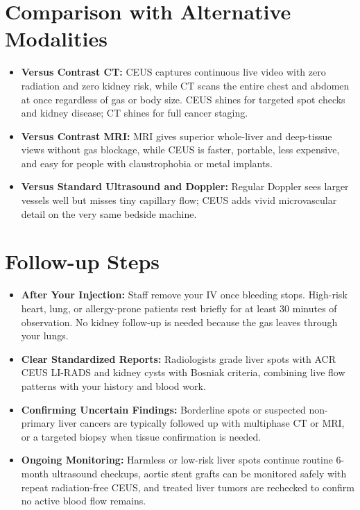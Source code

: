 \section{Comparison with Alternative Modalities}

\begin{itemize}
    \item \textbf{Versus Contrast CT:} CEUS captures continuous live video with zero radiation and zero kidney risk, while CT scans the entire chest and abdomen at once regardless of gas or body size. CEUS shines for targeted spot checks and kidney disease; CT shines for full cancer staging.
    \item \textbf{Versus Contrast MRI:} MRI gives superior whole-liver and deep-tissue views without gas blockage, while CEUS is faster, portable, less expensive, and easy for people with claustrophobia or metal implants.
    \item \textbf{Versus Standard Ultrasound and Doppler:} Regular Doppler sees larger vessels well but misses tiny capillary flow; CEUS adds vivid microvascular detail on the very same bedside machine.
\end{itemize}

\section{Follow-up Steps}

\begin{itemize}
    \item \textbf{After Your Injection:} Staff remove your IV once bleeding stops. High-risk heart, lung, or allergy-prone patients rest briefly for at least 30 minutes of observation. No kidney follow-up is needed because the gas leaves through your lungs.
    \item \textbf{Clear Standardized Reports:} Radiologists grade liver spots with ACR CEUS LI-RADS and kidney cysts with Bosniak criteria, combining live flow patterns with your history and blood work.
    \item \textbf{Confirming Uncertain Findings:} Borderline spots or suspected non-primary liver cancers are typically followed up with multiphase CT or MRI, or a targeted biopsy when tissue confirmation is needed.
    \item \textbf{Ongoing Monitoring:} Harmless or low-risk liver spots continue routine 6-month ultrasound checkups, aortic stent grafts can be monitored safely with repeat radiation-free CEUS, and treated liver tumors are rechecked to confirm no active blood flow remains.
\end{itemize}

